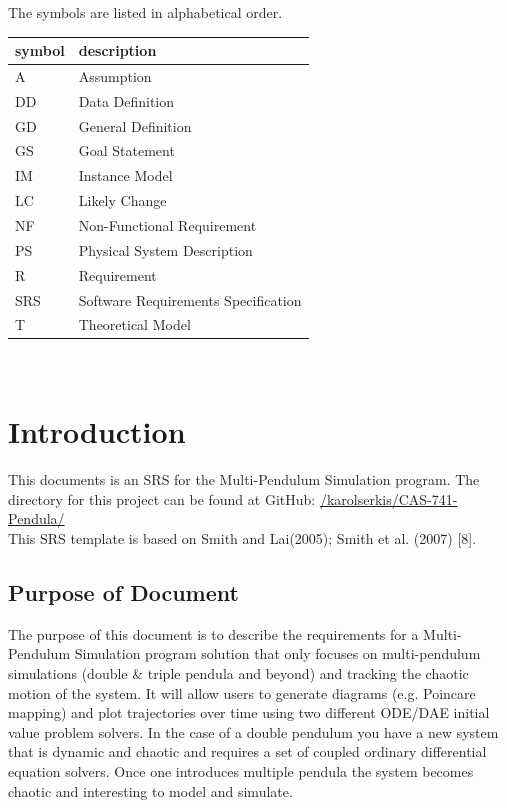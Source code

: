 \documentclass[12pt]{article}
\newcommand{\progname}{Multi-Pendulum Simulation }
\begin{document}
The symbols are listed in alphabetical order.\\

\renewcommand{\arraystretch}{1.2}
\begin{tabular}{l l} 
  \toprule		
  \textbf{symbol} & \textbf{description}\\
  \midrule 
  A & Assumption\\
  DD & Data Definition\\
  GD & General Definition\\
  GS & Goal Statement\\
  IM & Instance Model\\
  LC & Likely Change\\
  NF & Non-Functional Requirement\\
  PS & Physical System Description\\
  R & Requirement\\
  SRS & Software Requirements Specification\\
  T & Theoretical Model\\
  \bottomrule
\end{tabular}\\

\newpage


\setcounter{secnumdepth}{3}

\section{Introduction}

This documents is an SRS for the \progname {} program. The directory for this
project can
be found at GitHub:
\href{https://github.com/karolserkis/CAS-741-Pendula/}{/karolserkis/CAS-741-Pendula/}\\
This SRS template is based on Smith and Lai(2005); Smith et al. (2007)
[8]. 

\subsection{Purpose of Document}
The purpose of this document is to describe the requirements for a
\progname program solution that
only focuses on multi-pendulum simulations (double \& triple pendula and beyond) and tracking the chaotic
motion of the system. It will allow users to generate diagrams (e.g. Poincare
mapping)
and plot trajectories over time using two different ODE/DAE initial value
problem solvers. In the case of
a double pendulum you have a new system that is dynamic and chaotic and
requires a set of coupled ordinary differential equation solvers. Once one
introduces
multiple
pendula the system becomes chaotic and interesting to model and simulate. 
\end{document}
